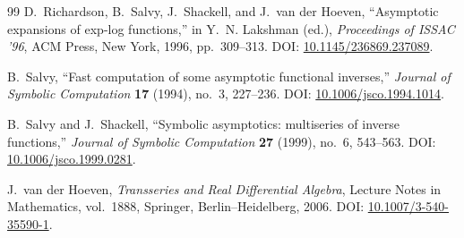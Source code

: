 \documentclass[11pt,openany]{book}
\theoremstyle{definition}
\theoremstyle{plain}
\theoremstyle{remark}
\begin{document}
\begin{thebibliography}{99}
D.~Richardson, B.~Salvy, J.~Shackell, and J.~van der Hoeven,
``Asymptotic expansions of exp-log functions,''
in Y.~N. Lakshman (ed.), \emph{Proceedings of ISSAC '96}, ACM Press,
New York, 1996, pp.~309--313.
\newblock DOI:
\href{https://doi.org/10.1145/236869.237089}{10.1145/236869.237089}.

B.~Salvy,
``Fast computation of some asymptotic functional inverses,''
\emph{Journal of Symbolic Computation} \textbf{17} (1994), no.~3,
227--236.
\newblock DOI:
\href{https://doi.org/10.1006/jsco.1994.1014}{10.1006/jsco.1994.1014}.

B.~Salvy and J.~Shackell,
``Symbolic asymptotics: multiseries of inverse functions,''
\emph{Journal of Symbolic Computation} \textbf{27} (1999), no.~6,
543--563.
\newblock DOI:
\href{https://doi.org/10.1006/jsco.1999.0281}{10.1006/jsco.1999.0281}.

J.~van der Hoeven,
\emph{Transseries and Real Differential Algebra},
Lecture Notes in Mathematics, vol.~1888, Springer, Berlin--Heidelberg, 2006.
\newblock DOI:
\href{https://doi.org/10.1007/3-540-35590-1}{10.1007/3-540-35590-1}.

\end{thebibliography}
\end{document}
